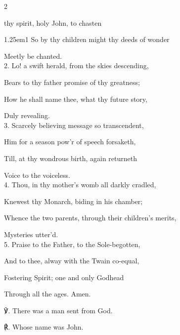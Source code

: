 \begin{paracol}{2}
\sloppy

\firstEvensong
{}

\firstEvensongHymn
{} thy spirit, holy John, to chasten


\begin{hangparas}{1.25em}{1}
So by thy children might thy deeds of wonder

Meetly be chanted.\\

2. Lo! a swift herald, from the skies descending,

Bears to thy father promise of thy greatness;

How he shall name thee, what thy future story,

Duly revealing.\\

3. Scarcely believing message so transcendent,

Him for a season pow'r of speech forsaketh,

Till, at thy wondrous birth, again returneth

Voice to the voiceless.\\

4. Thou, in thy mother’s womb all darkly cradled,

Knewest thy Monarch, biding in his chamber;

Whence the two parents, through their children’s merits,

Mysteries utter'd.\\

5. Praise to the Father, to the Sole-begotten,

And to thee, alway with the Twain co-equal,

Fostering Spirit; one and only Godhead

Through all the ages. Amen.\\	
\end{hangparas}

℣. There was a man sent from God.

℟. Whose name was John.



\end{paracol}
